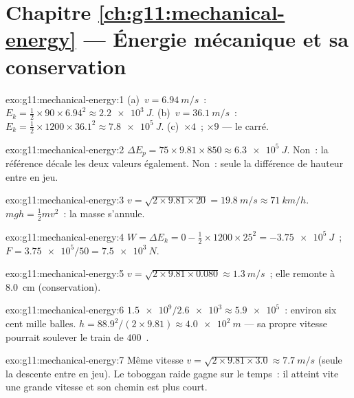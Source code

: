 \section*{Chapitre \ref{ch:g11:mechanical-energy} --- Énergie mécanique et sa conservation}

\begin{solution}{exo:g11:mechanical-energy:1}
(a)~$v = \qty{6.94}{m/s}$~:
$E_k = \tfrac12 \times 90 \times 6.94^2 \approx \qty{2.2e3}{J}$.
(b)~$v = \qty{36.1}{m/s}$~:
$E_k = \tfrac12 \times 1200 \times 36.1^2 \approx \qty{7.8e5}{J}$.
(c)~$\times 4$~; $\times 9$ --- le carré.
\end{solution}

\begin{solution}{exo:g11:mechanical-energy:2}
$\Delta E_p = 75 \times 9.81 \times 850 \approx \qty{6.3e5}{J}$. Non~:
la référence décale les deux valeurs également. Non~: seule la
différence de hauteur entre en jeu.
\end{solution}

\begin{solution}{exo:g11:mechanical-energy:3}
$v = \sqrt{2 \times 9.81 \times 20} = \qty{19.8}{m/s} \approx
\qty{71}{km/h}$. $mgh = \tfrac12 mv^2$~: la masse s'annule.
\end{solution}

\begin{solution}{exo:g11:mechanical-energy:4}
$W = \Delta E_k = 0 - \tfrac12 \times 1200 \times 25^2 =
\qty{-3.75e5}{J}$~; $F = \num{3.75e5}/50 = \qty{7.5e3}{N}$.
\end{solution}

\begin{solution}{exo:g11:mechanical-energy:5}
$v = \sqrt{2 \times 9.81 \times 0.080} \approx \qty{1.3}{m/s}$~; elle
remonte à \qty{8.0}{cm} (conservation).
\end{solution}

\begin{solution}{exo:g11:mechanical-energy:6}
$\num{1.5e9}/\num{2.6e3} \approx \num{5.9e5}$~: environ six cent mille
balles. $h = 88.9^2/(2 \times 9.81) \approx \qty{4.0e2}{m}$ --- sa
propre vitesse pourrait soulever le train de $400$~.
\end{solution}

\begin{solution}{exo:g11:mechanical-energy:7}
Même vitesse $v = \sqrt{2 \times 9.81 \times 3.0} \approx \qty{7.7}{m/s}$
(seule la descente entre en jeu). Le toboggan raide gagne sur le temps~:
il atteint vite une grande vitesse et son chemin est plus court.
\end{solution}

